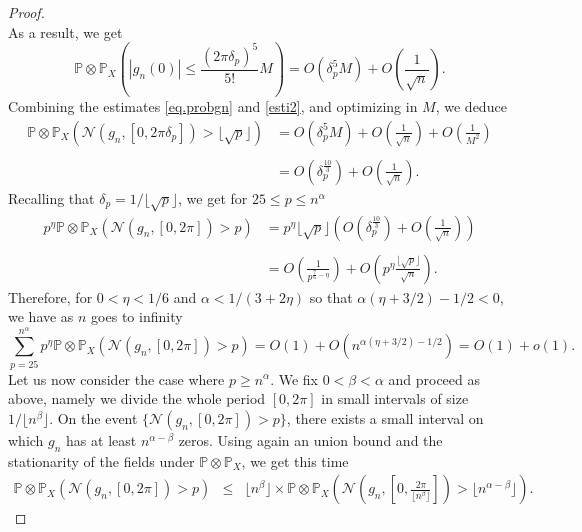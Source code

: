 \documentclass{svproc}
\newcommand{\Prob}{\mathbb{P}}
\begin{document}
\begin{proof}
\[\]
As a result, we get 
\begin{equation}\label{esti2}
 \Prob \otimes \Prob_X\left(|g_n(0)|\leq \frac{(2\pi \delta_p)^{5}}{5!}M\right) = O\left(  \delta_p^5 M \right)  + O\left(  \frac{1}{\sqrt{n}} \right) .
\end{equation}
Combining the estimates \eqref{eq.probgn} and \eqref{esti2}, and optimizing in $M$, we deduce
\[
\begin{array}{ll}
\displaystyle{\Prob \otimes \Prob_X\left(\mathcal{N}(g_n,[0,2\pi\delta_p])>\lfloor \sqrt{p} \rfloor\right)} & \displaystyle{= O\left(  \delta_p^5 M \right)  + O\left(  \frac{1}{\sqrt{n}} \right)+ O\left( \frac{1}{M^2}\right)} \\
\\
& \displaystyle{= O\left(  \delta_p^{\frac{10}{3}} \right)  + O\left(  \frac{1}{\sqrt{n}} \right)}.
\end{array}
\]
Recalling that $\delta_p=1/\lfloor \sqrt{p} \rfloor$, we get for $25 \leq p \leq n^{\alpha}$
\[
\begin{array}{ll}
p^{\eta} \displaystyle{\Prob\otimes\Prob_X (\mathcal{N}(g_n,[0,2\pi])>p)} & = p^{\eta} \displaystyle{\lfloor \sqrt{p} \rfloor \left(   O\left(  \delta_p^{\frac{10}{3}} \right)  + O\left(  \frac{1}{\sqrt{n}} \right) \right) }\\
\\
& \displaystyle{=   O\left(  \frac{1}{p^{\frac{7}{6}-\eta}} \right)  + O\left(  p^{\eta} \frac{\lfloor \sqrt{p} \rfloor}{\sqrt{n}} \right).  }
\end{array}
\]
Therefore, for $0<\eta<1/6$ and $\alpha < 1/(3+2\eta)$ so that $\alpha ( \eta+3/2)-1/2<0$, we have as $n$ goes to infinity
\[
\sum_{p=25}^{n^{\alpha}} p^{\eta} \displaystyle{\Prob\otimes\Prob_X (\mathcal{N}(g_n,[0,2\pi])>p)} = O(1) + O\left(  n^{\alpha ( \eta+3/2)-1/2}\right) = O(1)+o(1).
\]
Let us now consider the case where $p \geq n^{\alpha}$. We fix $0<\beta<\alpha$ and proceed as above, namely we divide the whole period $[0,2\pi]$ in small intervals of size $1/\lfloor n^{\beta}\rfloor$. On the event $\{\mathcal{N}(g_n,[0,2\pi])>p\}$, there exists a small interval on which $g_n$ has at least $n^{\alpha-\beta}$ zeros. Using again an union bound and the stationarity of the fields under $\Prob\otimes\Prob_X$, we get this time
\begin{eqnarray*}
\Prob\otimes\Prob_X (\mathcal{N}(g_n,[0,2\pi])>p) & \leq &  \lfloor n^{\beta} \rfloor \times \Prob \otimes\Prob_X\left(    \mathcal{N}\left(g_n,\left[0,  \frac{2\pi}{\lfloor n^{\beta}  \rfloor} \right ]\right)> \lfloor n^{\alpha-\beta} \rfloor \right).

\end{eqnarray*}
\end{proof}
\end{document}
